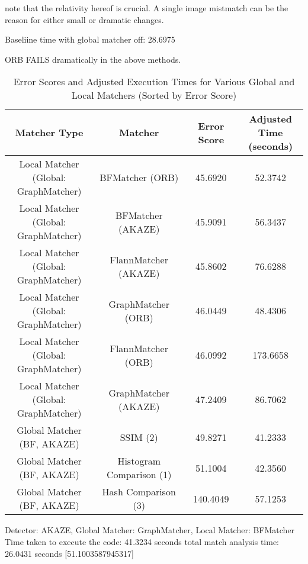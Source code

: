 note that the relativity hereof is crucial. A single image mistmatch can be the reason for either small or dramatic changes. 

Baseliine time with global matcher off: 28.6975
    

ORB FAILS dramatically in the above methods. 


\begin{table}[H]
    \centering
    \small  %
    \setlength{\tabcolsep}{4pt}  %
    \renewcommand{\arraystretch}{1.2}  %
    \begin{tabular}{|c|c|c|c|}
    \hline
    \textbf{Matcher Type} & \textbf{Matcher} & \textbf{Error Score} & \makecell{\textbf{Adjusted} \\ \textbf{Time (seconds)}} \\ \hline
    \makecell{Local Matcher \\ (Global: GraphMatcher)} & BFMatcher (ORB) & 45.6920 & 52.3742 \\ \hline
    \makecell{Local Matcher \\ (Global: GraphMatcher)} & BFMatcher (AKAZE) & 45.9091 & 56.3437 \\ \hline
    \makecell{Local Matcher \\ (Global: GraphMatcher)} & FlannMatcher (AKAZE) & 45.8602 & 76.6288 \\ \hline
    \makecell{Local Matcher \\ (Global: GraphMatcher)} & GraphMatcher (ORB) & 46.0449 & 48.4306 \\ \hline
    \makecell{Local Matcher \\ (Global: GraphMatcher)} & FlannMatcher (ORB) & 46.0992 & 173.6658 \\ \hline
    \makecell{Local Matcher \\ (Global: GraphMatcher)} & GraphMatcher (AKAZE) & 47.2409 & 86.7062 \\ \hline
    \makecell{Global Matcher \\ (BF, AKAZE)} & SSIM (2) & 49.8271 & 41.2333 \\ \hline
    \makecell{Global Matcher \\ (BF, AKAZE)} & Histogram Comparison (1) & 51.1004 & 42.3560 \\ \hline
    \makecell{Global Matcher \\ (BF, AKAZE)} & Hash Comparison (3) & 140.4049 & 57.1253 \\ \hline
    \end{tabular}
    \caption{Error Scores and Adjusted Execution Times for Various Global and Local Matchers (Sorted by Error Score)}
\end{table}



Detector: AKAZE, Global Matcher: GraphMatcher, Local Matcher: BFMatcher
Time taken to execute the code: 41.3234 seconds
total match analysis time: 26.0431 seconds
[51.1003587945317]

